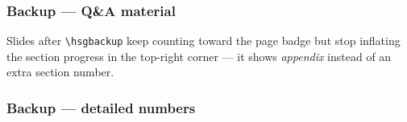 \documentclass[aspectratio=169,xcolor=table]{beamer}
\begin{document}
\hsgbackup

\begin{frame}
  \frametitle{Backup --- Q\&A material}
  Slides after \texttt{\textbackslash hsgbackup} keep counting toward the page
  badge but stop inflating the section progress in the top-right corner ---
  it shows \emph{appendix} instead of an extra section number.
\end{frame}

\begin{frame}
  \frametitle{Backup --- detailed numbers}
\end{frame}

\hsgclosing
\end{document}
